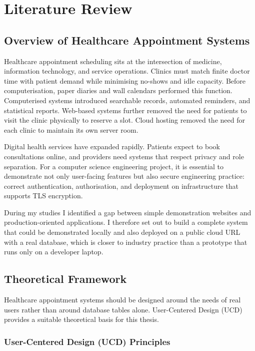 \chapter{Literature Review}

\section{Overview of Healthcare Appointment Systems}

Healthcare appointment scheduling sits at the intersection of medicine, information technology, and service operations. Clinics must match finite doctor time with patient demand while minimising no-shows and idle capacity. Before computerisation, paper diaries and wall calendars performed this function. Computerised systems introduced searchable records, automated reminders, and statistical reports. Web-based systems further removed the need for patients to visit the clinic physically to reserve a slot. Cloud hosting removed the need for each clinic to maintain its own server room.

Digital health services have expanded rapidly. Patients expect to book consultations online, and providers need systems that respect privacy and role separation. For a computer science engineering project, it is essential to demonstrate not only user-facing features but also secure engineering practice: correct authentication, authorisation, and deployment on infrastructure that supports TLS encryption.

During my studies I identified a gap between simple demonstration websites and production-oriented applications. I therefore set out to build a complete system that could be demonstrated locally and also deployed on a public cloud URL with a real database, which is closer to industry practice than a prototype that runs only on a developer laptop.

\section{Theoretical Framework}

Healthcare appointment systems should be designed around the needs of real users rather than around database tables alone. User-Centered Design (UCD) provides a suitable theoretical basis for this thesis.

\subsection{User-Centered Design (UCD) Principles}

